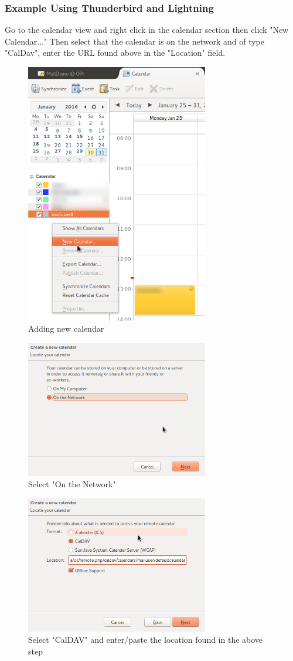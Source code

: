 \documentclass[12pt,a4paper,titlepage]{article}
\begin{document}
\subsubsection{Example Using Thunderbird and Lightning}
Go to the calendar view and right click in the calendar section then click "New Calendar..." Then select that the calendar is on the network and of type "CalDav", enter the URL found above in the "Location" field.
\begin{figure}[h!]
\centering
\includegraphics[width=8cm]{./img/External-clients-lightning0.png}
\caption{Adding new calendar}
\end{figure}
\begin{figure}[h!]
\centering
\includegraphics[width=8cm]{./img/External-clients-lightning1.png}
\caption{Select "On the Network"}
\end{figure}
\begin{figure}[h!]
\centering
\includegraphics[width=8cm]{./img/External-clients-lightning2.png}
\caption{Select "CalDAV" and enter/paste the location found in the above step}
\end{figure}
\end{document}
